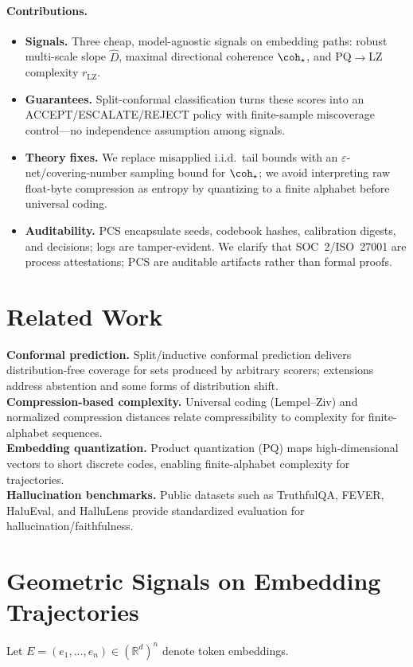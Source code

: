 \documentclass[11pt]{article}
\begin{document}
\paragraph{Contributions.}
\begin{itemize}
  \item \textbf{Signals.} Three cheap, model-agnostic signals on embedding paths: robust multi-scale slope $\hat D$, maximal directional coherence $\coh_\star$, and PQ$\to$LZ complexity $r_{\mathrm{LZ}}$.
  \item \textbf{Guarantees.} Split-conformal classification turns these scores into an \textsc{ACCEPT}/\textsc{ESCALATE}/\textsc{REJECT} policy with finite-sample miscoverage control---no independence assumption among signals.
  \item \textbf{Theory fixes.} We replace misapplied i.i.d.\ tail bounds with an $\varepsilon$-net/covering-number sampling bound for $\coh_\star$; we avoid interpreting raw float-byte compression as entropy by quantizing to a finite alphabet before universal coding.
  \item \textbf{Auditability.} PCS encapsulate seeds, codebook hashes, calibration digests, and decisions; logs are tamper-evident. We clarify that SOC~2/ISO~27001 are process attestations; PCS are auditable artifacts rather than formal proofs.
\end{itemize}

\section{Related Work}
\textbf{Conformal prediction.} Split/inductive conformal prediction delivers distribution-free coverage for sets produced by arbitrary scorers; extensions address abstention and some forms of distribution shift.\\
\textbf{Compression-based complexity.} Universal coding (Lempel--Ziv) and normalized compression distances relate compressibility to complexity for finite-alphabet sequences.\\
\textbf{Embedding quantization.} Product quantization (PQ) maps high-dimensional vectors to short discrete codes, enabling finite-alphabet complexity for trajectories.\\
\textbf{Hallucination benchmarks.} Public datasets such as TruthfulQA, FEVER, HaluEval, and HalluLens provide standardized evaluation for hallucination/faithfulness.

\section{Geometric Signals on Embedding Trajectories}
Let $E=(e_1,\dots,e_n)\in(\mathbb{R}^d)^n$ denote token embeddings.
\end{document}
